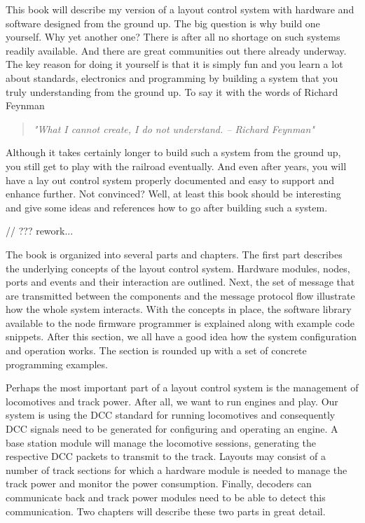 
This book will describe my version of a layout control system with hardware and software designed from the ground up. The big question is why build one yourself. Why yet another one? There is after all no shortage on such systems readily available. And there are great communities out there already underway. The key reason for doing it yourself is that it is simply fun and you learn a lot about standards, electronics and programming by building a system that you truly understanding from the ground up. To say it with the words of Richard Feynman

\begin{quotation}
    \textit{ "What I cannot create, I do not understand. -- Richard Feynman"}
\end{quotation}

Although it takes certainly longer to build such a system from the ground up, you still get to play with the railroad eventually. And even after years, you will have a lay  out control system properly documented and easy to support and enhance further. Not convinced? Well, at least this book should be interesting and give some ideas and references how to go after building such a system.



// ??? rework...

The book is organized into several parts and chapters. The first part describes the underlying concepts of the layout control system. Hardware modules, nodes, ports and events and their interaction are outlined. Next, the set of message that are transmitted between the components and the message protocol flow illustrate how the whole system interacts. With the concepts in place, the software library available to the node firmware programmer is explained along with example code snippets. After this section, we all have a good idea how the system configuration and operation works. The section is rounded up with a set of concrete programming examples.

Perhaps the most important part of a layout control system is the management of locomotives and track power. After all, we want to run engines and play. Our system is using the DCC standard for running locomotives and consequently DCC signals need to be generated for configuring and operating an engine. A base station module will manage the locomotive sessions, generating the respective DCC packets to transmit to the track. Layouts may consist of a number of track sections for which a hardware module is needed to manage the track power and monitor the power consumption. Finally, decoders can communicate back and track power modules need to be able to detect this communication. Two chapters will describe these two parts in great detail.

